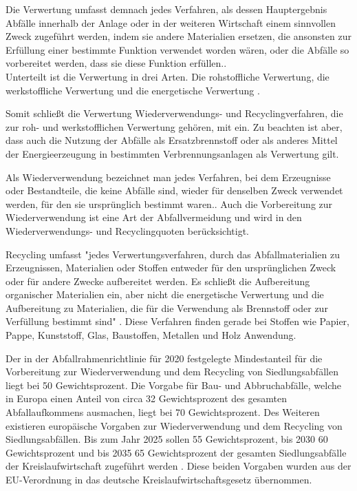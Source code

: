 Die Verwertung umfasst demnach \glqq jedes Verfahren, als dessen Hauptergebnis Abfälle innerhalb der Anlage oder in der weiteren Wirtschaft einem sinnvollen Zweck zugeführt werden, indem sie andere Materialien ersetzen, die ansonsten zur Erfüllung einer bestimmte Funktion verwendet worden wären, oder die Abfälle so vorbereitet werden, dass sie diese Funktion erfüllen.\grqq \cite{EURichtlinie2008}.
\\
Unterteilt ist die Verwertung in drei Arten. Die rohstoffliche Verwertung, die werkstoffliche Verwertung und die energetische Verwertung \cite{Bilitewski}.

Somit schließt die Verwertung Wiederverwendungs- und Recyclingverfahren, die zur roh- und werkstofflichen Verwertung gehören, mit ein. Zu beachten ist aber, dass auch die Nutzung der Abfälle als Ersatzbrennstoff oder als anderes Mittel der Energieerzeugung in bestimmten Verbrennungsanlagen als Verwertung gilt.

Als Wiederverwendung bezeichnet man \glqq jedes Verfahren, bei dem Erzeugnisse oder Bestandteile, die keine Abfälle sind, wieder für denselben Zweck verwendet werden, für den sie ursprünglich bestimmt waren.\grqq \cite{EURichtlinie2008}. Auch die Vorbereitung zur Wiederverwendung ist eine Art der Abfallvermeidung und wird in den Wiederverwendungs- und Recyclingquoten berücksichtigt.

Recycling umfasst "jedes Verwertungsverfahren, durch das Abfallmaterialien zu Erzeugnissen, Materialien oder Stoffen entweder für den ursprünglichen Zweck oder für andere Zwecke aufbereitet werden. Es schließt die Aufbereitung organischer Materialien ein, aber nicht die energetische Verwertung und die Aufbereitung zu Materialien, die für die Verwendung als Brennstoff oder zur Verfüllung bestimmt sind" \cite{EURichtlinie2008}. Diese Verfahren finden gerade bei Stoffen wie Papier, Pappe, Kunststoff, Glas, Baustoffen, Metallen und Holz Anwendung.

Der in der Abfallrahmenrichtlinie für 2020 festgelegte Mindestanteil für die Vorbereitung zur Wiederverwendung und dem Recycling von Siedlungsabfällen liegt bei 50 Gewichtsprozent. Die Vorgabe für Bau- und Abbruchabfälle, welche in Europa einen Anteil von circa 32 Gewichtsprozent des gesamten Abfallaufkommens ausmachen, liegt bei 70 Gewichtsprozent.
Des Weiteren existieren europäische Vorgaben zur Wiederverwendung und dem Recycling von Siedlungsabfällen. Bis zum Jahr 2025 sollen 55 Gewichtsprozent, bis 2030 60 Gewichtsprozent und bis 2035 65 Gewichtsprozent der gesamten Siedlungsabfälle der Kreislaufwirtschaft zugeführt werden \cite{EURichtlinie2008}. Diese beiden Vorgaben wurden aus der EU-Verordnung in das deutsche Kreislaufwirtschaftsgesetz übernommen.


